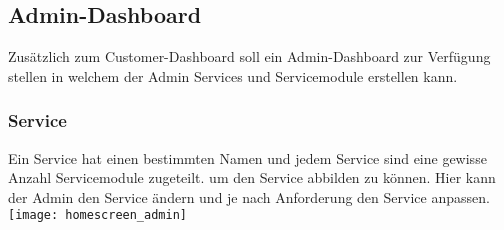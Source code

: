 \newpage
\subsection{Admin-Dashboard}
Zusätzlich zum Customer-Dashboard soll ein Admin-Dashboard zur Verfügung stellen 
in welchem der Admin Services und Servicemodule erstellen kann.

\subsubsection{Service}
Ein Service hat einen bestimmten Namen und jedem Service sind eine gewisse 
Anzahl Servicemodule zugeteilt. um den Service abbilden zu können.
Hier kann der Admin den Service ändern und je nach Anforderung den Service 
anpassen.
\newline
\texttt{[image: homescreen\_admin]}
